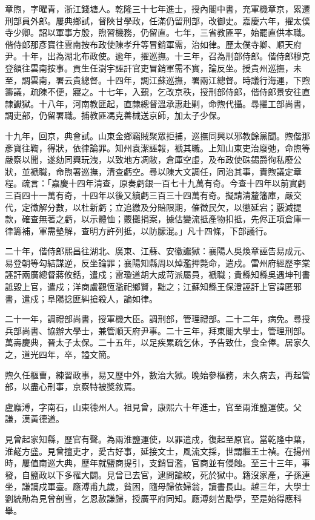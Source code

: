 \begin{pinyinscope}
章煦，字曜青，浙江錢塘人。乾隆三十七年進士，授內閣中書，充軍機章京，累遷刑部員外郎。屢典鄉試，督陜甘學政，任滿仍留刑部，改御史。嘉慶六年，擢太僕寺少卿。詔以軍事方殷，煦習機務，仍留直。七年，三省教匪平，始罷直供本職。偕侍郎那彥寶往雲南按布政使陳孝升等冒銷軍需，治如律。歷太僕寺卿、順天府尹。十年，出為湖北布政使。逾年，擢巡撫。十三年，召為刑部侍郎。偕侍郎穆克登額往雲南按事。貢生任澍宇誣訐官吏冒銷軍需不實，論反坐。授貴州巡撫，未至，調雲南，署云貴總督。十四年，調江蘇巡撫，署兩江總督。時議行海運，下煦籌議，疏陳不便，寢之。十七年，入覲，乞改京秩，授刑部侍郎，偕侍郎景安往直隸讞獄。十八年，河南教匪起，直隸總督溫承惠赴剿，命煦代攝。尋擢工部尚書，調吏部，仍留署職。捕教匪馮克善械送京師，加太子少保。

十九年，回京，典會試。山東金鄉竊賊聚眾拒捕，巡撫同興以邪教餘黨聞。煦偕那彥寶往鞫，得狀，依律論罪。知州袁潔誣報，褫其職。上知山東吏治廢弛，命煦等嚴察以聞，遂劾同興玩洩，以致地方凋敝，倉庫空虛，及布政使硃錫爵徇私廢公狀，並褫職，命煦署巡撫，清查虧空。尋以陳大文調任，同治其事，責煦議定章程。疏言：「嘉慶十四年清查，原奏虧銀一百七十九萬有奇。今查十四年以前實虧三百四十一萬有奇，十四年以後又續虧三百三十四萬有奇。擬請清釐籓庫，嚴交代，定徵解分數，以杜新虧；立追繳及分賠限期，催徵民欠，以懲延宕；覈減提款，確查無著之虧，以示體恤；覈攤捐案，據估變流抵產物扣抵，先侭正項倉庫一律籌補，軍需墊解，查明方許列抵，以防朦混。」凡十四條，下部議行。

二十年，偕侍郎熙昌往湖北、廣東、江蘇、安徽讞獄：襄陽人吳煥章誣告易成元、易登朝等勾結謀逆，反坐論罪；襄陽知縣周以焯濫押斃命，遣戍。雷州府經歷李棠誣訐兩廣總督蔣攸銛，遣戍；雷瓊道胡大成苛派屬員，褫職；貴縣知縣吳遇坤刊書詆毀上官，遣戍；洋商盧觀恆濫祀鄉賢，黜之；江蘇知縣王保澄誣訐上官諱匿邪書，遣戍；阜陽捻匪糾搶殺人，論如律。

二十一年，調禮部尚書，授軍機大臣。調刑部，管理禮部。二十二年，病免。尋授兵部尚書、協辦大學士，兼管順天府尹事。二十三年，拜東閣大學士，管理刑部。萬壽慶典，晉太子太保。二十五年，以足疾累疏乞休，予告致仕，食全俸。居家久之，道光四年，卒，謚文簡。

煦久任樞曹，練習政事，易又歷中外，數治大獄。晚始參樞務，未久病去，再起管部，以盡心刑事，京察特被獎敘焉。

盧廕溥，字南石，山東德州人。祖見曾，康熙六十年進士，官至兩淮鹽運使。父謙，漢黃德道。

見曾起家知縣，歷官有聲。為兩淮鹽運使，以罪遣戍，復起至原官。當乾隆中葉，淮鹺方盛。見曾擅吏才，愛古好事，延接文士，風流文採，世謂繼王士禎。在揚州時，屢值南巡大典，歷年就鹽商提引，支銷冒濫，官商並有侵蝕。至三十三年，事發，自鹽政以下多罹大闢。見曾已去官，逮問論絞，死於獄中。籍沒家產，子孫連坐，謙謫戍軍臺。廕溥甫九歲，貧困，隨母歸依婦翁，讀書長山。越三年，大學士劉統勛為見曾剖雪，乞恩赦謙歸，授廣平府同知。廕溥刻苦勵學，至是始得應科舉。


\end{pinyinscope}
